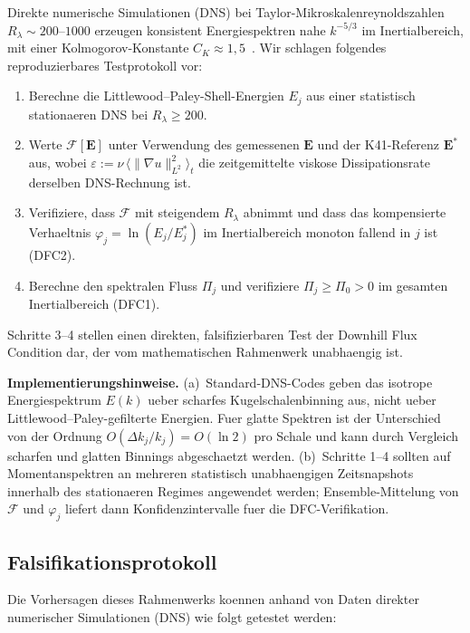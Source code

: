 \documentclass[12pt,a4paper]{article}
\theoremstyle{definition}
\theoremstyle{plain}
\theoremstyle{remark}
\begin{document}
Direkte numerische Simulationen (DNS) bei Taylor-Mikroskalenreynoldszahlen
$R_\lambda \sim 200$--$1000$ erzeugen konsistent Energiespektren nahe
$k^{-5/3}$ im Inertialbereich, mit einer Kolmogorov-Konstante
$C_K \approx 1{,}5$~\cite{ES06,Frisch95,MY75}. Wir schlagen folgendes
reproduzierbares Testprotokoll vor:
\begin{enumerate}
\item Berechne die Littlewood--Paley-Shell-Energien $E_j$ aus einer
  statistisch stationaeren DNS bei $R_\lambda \ge 200$.
\item Werte $\mathcal{F}[\mathbf{E}]$ unter Verwendung des gemessenen
  $\mathbf{E}$ und der K41-Referenz $\mathbf{E}^*$ aus, wobei
  $\varepsilon := \nu\,\langle\|\nabla u\|_{L^2}^2\rangle_t$
  die zeitgemittelte viskose Dissipationsrate derselben DNS-Rechnung ist.
\item Verifiziere, dass $\mathcal{F}$ mit steigendem $R_\lambda$
  abnimmt und dass das kompensierte Verhaeltnis
  $\varphi_j = \ln(E_j/E_j^*)$ im Inertialbereich monoton fallend
  in $j$ ist (DFC2).
\item Berechne den spektralen Fluss $\Pi_j$ und verifiziere
  $\Pi_j \ge \Pi_0 > 0$ im gesamten Inertialbereich (DFC1).
\end{enumerate}
Schritte 3--4 stellen einen direkten, falsifizierbaren Test der Downhill
Flux Condition dar, der vom mathematischen Rahmenwerk unabhaengig ist.

\smallskip\noindent
\textbf{Implementierungshinweise.}\;
(a)~Standard-DNS-Codes geben das isotrope Energiespektrum $E(k)$ ueber
scharfes Kugelschalenbinning aus, nicht ueber Littlewood--Paley-gefilterte
Energien. Fuer glatte Spektren ist der Unterschied von der Ordnung
$O(\Delta k_j / k_j) = O(\ln 2)$ pro Schale und kann durch Vergleich
scharfen und glatten Binnings abgeschaetzt werden.
(b)~Schritte 1--4 sollten auf Momentanspektren an mehreren statistisch
unabhaengigen Zeitsnapshots innerhalb des stationaeren Regimes angewendet
werden; Ensemble-Mittelung von $\mathcal{F}$ und $\varphi_j$ liefert
dann Konfidenzintervalle fuer die DFC-Verifikation.

\subsection{Falsifikationsprotokoll}
\label{sec:falsification}

Die Vorhersagen dieses Rahmenwerks koennen anhand von Daten direkter numerischer Simulationen (DNS) wie folgt getestet werden:
\end{document}
